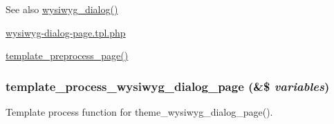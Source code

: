\begin{DoxySeeAlso}{See also}
\hyperlink{wysiwyg_8dialog_8inc_a57c7ce003075f4a07b9a555a822755b8}{wysiwyg\_\-dialog()} 

\hyperlink{wysiwyg-dialog-page_8tpl_8php}{wysiwyg-\/dialog-\/page.tpl.php} 

\hyperlink{includes_2theme_8inc_a128dae24f990d8ba4710ac78b0584c11}{template\_\-preprocess\_\-page()} 
\end{DoxySeeAlso}
\hypertarget{wysiwyg_8dialog_8inc_ac59a9d7f504a104da018256132f53b60}{
\subsubsection[{template\_\-process\_\-wysiwyg\_\-dialog\_\-page}]{\setlength{\rightskip}{0pt plus 5cm}template\_\-process\_\-wysiwyg\_\-dialog\_\-page (\&\$ {\em variables})}}
\label{wysiwyg_8dialog_8inc_ac59a9d7f504a104da018256132f53b60}
Template process function for theme\_\-wysiwyg\_\-dialog\_\-page().

